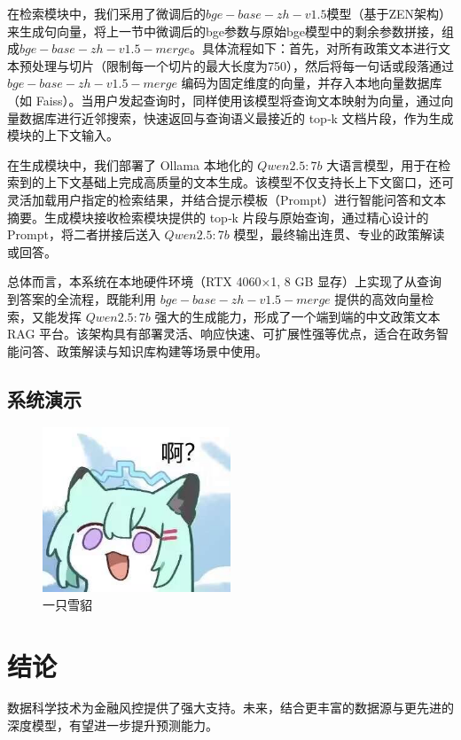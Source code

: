 \documentclass[12pt, a4paper]{ctexart}
\begin{document}
在检索模块中，我们采用了微调后的$ bge-base-zh-v1.5 $模型（基于ZEN架构）来生成句向量，将上一节中微调后的bge参数与原始bge模型中的剩余参数拼接，组成$bge-base-zh-v1.5-merge$。具体流程如下：首先，对所有政策文本进行文本预处理与切片（限制每一个切片的最大长度为750），然后将每一句话或段落通过 $bge-base-zh-v1.5-merge$ 编码为固定维度的向量，并存入本地向量数据库（如 Faiss）。当用户发起查询时，同样使用该模型将查询文本映射为向量，通过向量数据库进行近邻搜索，快速返回与查询语义最接近的 top‑k 文档片段，作为生成模块的上下文输入。

在生成模块中，我们部署了 Ollama 本地化的 $Qwen2.5:7b$ 大语言模型，用于在检索到的上下文基础上完成高质量的文本生成。该模型不仅支持长上下文窗口，还可灵活加载用户指定的检索结果，并结合提示模板（Prompt）进行智能问答和文本摘要。生成模块接收检索模块提供的 top‑k 片段与原始查询，通过精心设计的 Prompt，将二者拼接后送入 $Qwen2.5:7b$ 模型，最终输出连贯、专业的政策解读或回答。

总体而言，本系统在本地硬件环境（RTX 4060×1, 8 GB 显存）上实现了从查询到答案的全流程，既能利用 $bge-base-zh-v1.5-merge$ 提供的高效向量检索，又能发挥 $Qwen2.5:7b$ 强大的生成能力，形成了一个端到端的中文政策文本 RAG 平台。该架构具有部署灵活、响应快速、可扩展性强等优点，适合在政务智能问答、政策解读与知识库构建等场景中使用。

\subsection{系统演示}

\begin{figure}[H]
    \centering
    \includegraphics[width=0.5\textwidth]{./images/test.jpg}
    \caption{一只雪貂}
    \label{fig:test}
\end{figure}


\section{结论}
数据科学技术为金融风控提供了强大支持。未来，结合更丰富的数据源与更先进的深度模型，有望进一步提升预测能力。

\newpage


\end{document}
